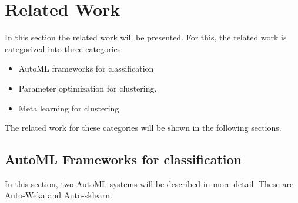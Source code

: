 \chapter{Related Work}
\label{chap:related}
In this section the related work will be presented.
For this, the related work is categorized into three categories:
\begin{itemize}
    \item \gls{AutoML} frameworks for classification
    \item Parameter optimization for clustering. 
    \item Meta learning for clustering
\end{itemize}

The related work for these categories will be shown in the following sections.

\section{AutoML Frameworks for classification}

In this section, two AutoML systems will be described in more detail.
These are Auto-Weka and Auto-sklearn.

